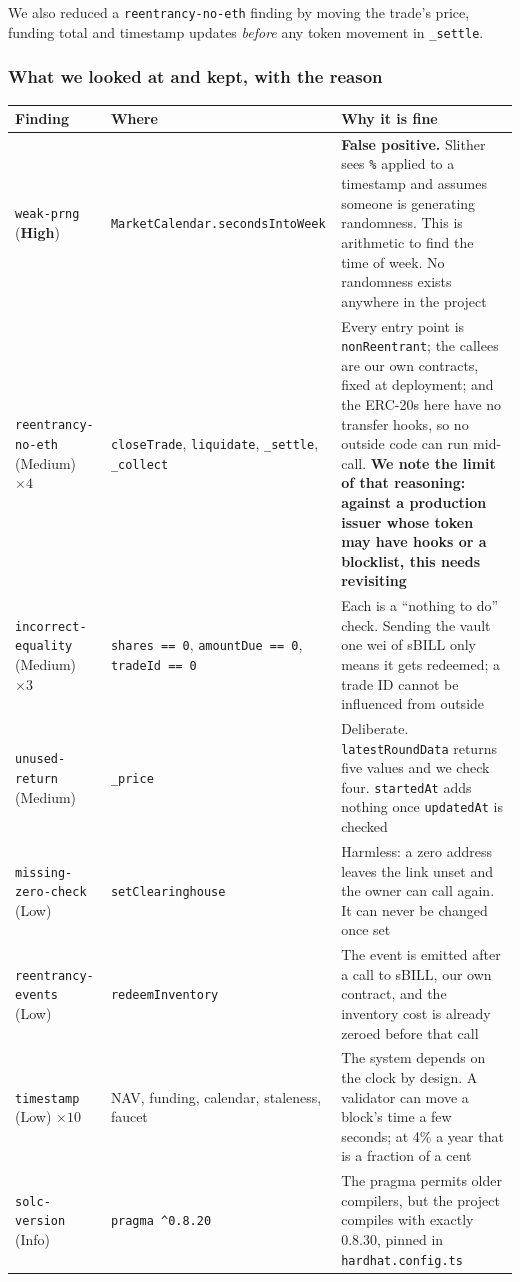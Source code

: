 \documentclass[11pt,a4paper]{article}
\begin{document}
We also reduced a \texttt{reentrancy-no-eth} finding by moving the trade's price, funding total and
timestamp updates \emph{before} any token movement in \texttt{\_settle}.

\subsubsection*{What we looked at and kept, with the reason}

\begin{center}
\small
\begin{tabular}{@{}p{3.1cm}p{3.6cm}p{8.5cm}@{}}
\toprule
\textbf{Finding} & \textbf{Where} & \textbf{Why it is fine} \\
\midrule
\texttt{weak-prng} (\textbf{High}) & \texttt{MarketCalendar.}\newline\texttt{secondsIntoWeek} & \textbf{False positive.} Slither sees \texttt{\%} applied to a timestamp and assumes someone is generating randomness. This is arithmetic to find the time of week. No randomness exists anywhere in the project \\
\texttt{reentrancy-no-eth} (Medium) $\times4$ & \texttt{closeTrade}, \texttt{liquidate}, \texttt{\_settle}, \texttt{\_collect} & Every entry point is \texttt{nonReentrant}; the callees are our own contracts, fixed at deployment; and the ERC-20s here have no transfer hooks, so no outside code can run mid-call. \textbf{We note the limit of that reasoning: against a production issuer whose token may have hooks or a blocklist, this needs revisiting} \\
\texttt{incorrect-equality} (Medium) $\times3$ & \texttt{shares == 0}, \texttt{amountDue == 0}, \texttt{tradeId == 0} & Each is a ``nothing to do'' check. Sending the vault one wei of sBILL only means it gets redeemed; a trade ID cannot be influenced from outside \\
\texttt{unused-return} (Medium) & \texttt{\_price} & Deliberate. \texttt{latestRoundData} returns five values and we check four. \texttt{startedAt} adds nothing once \texttt{updatedAt} is checked \\
\texttt{missing-zero-check} (Low) & \texttt{setClearinghouse} & Harmless: a zero address leaves the link unset and the owner can call again. It can never be changed once set \\
\texttt{reentrancy-events} (Low) & \texttt{redeemInventory} & The event is emitted after a call to sBILL, our own contract, and the inventory cost is already zeroed before that call \\
\texttt{timestamp} (Low) $\times10$ & NAV, funding, calendar, staleness, faucet & The system depends on the clock by design. A validator can move a block's time a few seconds; at 4\% a year that is a fraction of a cent \\
\texttt{solc-version} (Info) & \texttt{pragma \^{}0.8.20} & The pragma permits older compilers, but the project compiles with exactly 0.8.30, pinned in \texttt{hardhat.config.ts} \\
\bottomrule
\end{tabular}
\end{center}
\end{document}

